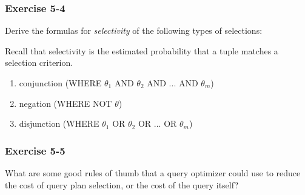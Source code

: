 \begin{frame}
\frametitle{Exercise 5-4}

Derive the formulas for \textit{selectivity} of the following types of selections:

Recall that selectivity is the estimated probability that a tuple matches a selection criterion.

\begin{enumerate}
  \item conjunction (WHERE $\theta_1$ AND $\theta_2$ AND ... AND $\theta_m$)
  \item negation (WHERE NOT $\theta$)
  \item disjunction (WHERE $\theta_1$ OR $\theta_2$ OR ... OR $\theta_m$)
\end{enumerate}

\end{frame}


\begin{frame}
\frametitle{Exercise 5-5}

What are some good rules of thumb that a query optimizer could use to reduce the cost of query plan selection, or the cost of the query itself?

\end{frame}



